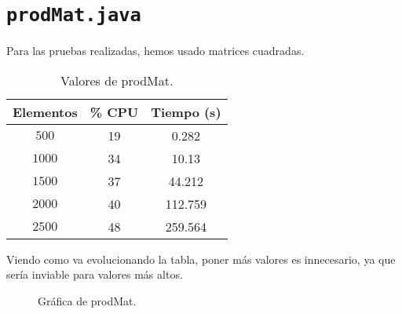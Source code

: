 \documentclass[12pt,letterpaper]{article}
\begin{document}
\section{\texttt{prodMat.java}}
\noindent
Para las pruebas realizadas, hemos usado matrices cuadradas.
\begin{center}
	\begin{table}[htbp]
		\begin{center}
			\begin{tabular}{|c|c|c|}
				\hline
				\textbf{Elementos} & \textbf{\% CPU} & \textbf{Tiempo (s)}  \\
				\hline 
				$500$ & 19 & 0.282\\ \hline	
				$1000$ & 34 & 10.13\\ \hline
				$1500$ & 37 & 44.212\\ \hline
				$2000$ & 40 & 112.759\\ \hline
				$2500$ & 48 & 259.564\\ \hline
			\end{tabular}
			\caption{Valores de prodMat.}
			\label{tabla:Valores de prodMat}
		\end{center}
	\end{table}
\end{center}
\noindent
Viendo como va evolucionando la tabla, poner más valores es innecesario, ya que sería inviable para valores más altos.
\begin{figure}
	\begin{center}
		\caption{Gráfica de prodMat.}
		\label{fig: prodMat}
	\end{center}	
\end{figure}


\newpage
\end{document}
